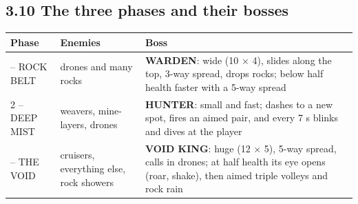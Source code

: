 \documentclass[11pt,a4paper]{article}
\begin{document}
\subsection*{3.10 The three phases and their bosses}
\par\noindent\begin{minipage}{\linewidth}\centering\small
\begin{tabular}{|>{\raggedright\arraybackslash}p{2.87cm}|>{\raggedright\arraybackslash}p{4.30cm}|>{\raggedright\arraybackslash}p{9.08cm}|}
\hline\rowcolor{accent}\textbf{\color{white}Phase} & \textbf{\color{white}Enemies} & \textbf{\color{white}Boss}\\\hline
1 – ROCK BELT & drones and many rocks & \textbf{WARDEN}: wide (10 × 4), slides along the top, 3-way spread, drops rocks; below half health faster with a 5-way spread\\\hline
\rowcolor{rowshade}2 – DEEP MIST & weavers, mine-layers, drones & \textbf{HUNTER}: small and fast; dashes to a new spot, fires an aimed pair, and every 7 s blinks and dives at the player\\\hline
3 – THE VOID & cruisers, everything else, rock showers & \textbf{VOID KING}: huge (12 × 5), 5-way spread, calls in drones; at half health its eye opens (roar, shake), then aimed triple volleys and rock rain\\\hline
\end{tabular}
\end{minipage}\par\medskip
\end{document}
